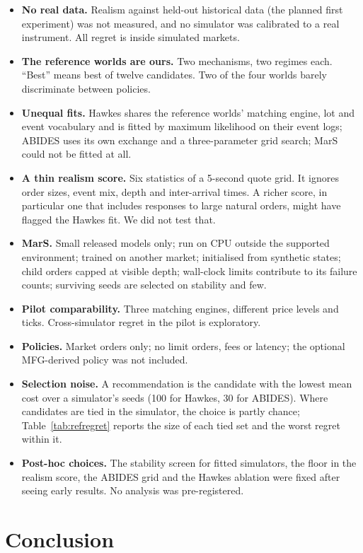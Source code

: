 \begin{itemize}[leftmargin=*,itemsep=2pt]
\item \textbf{No real data.} Realism against held-out historical data (the planned first experiment) was not measured, and no simulator was calibrated to a real instrument. All regret is inside simulated markets.
\item \textbf{The reference worlds are ours.} Two mechanisms, two regimes each. ``Best'' means best of twelve candidates. Two of the four worlds barely discriminate between policies.
\item \textbf{Unequal fits.} Hawkes shares the reference worlds' matching engine, lot and event vocabulary and is fitted by maximum likelihood on their event logs; ABIDES uses its own exchange and a three-parameter grid search; MarS could not be fitted at all.
\item \textbf{A thin realism score.} Six statistics of a 5-second quote grid. It ignores order sizes, event mix, depth and inter-arrival times. A richer score, in particular one that includes responses to large natural orders, might have flagged the Hawkes fit. We did not test that.
\item \textbf{MarS.} Small released models only; run on CPU outside the supported environment; trained on another market; initialised from synthetic states; child orders capped at visible depth; wall-clock limits contribute to its failure counts; surviving seeds are selected on stability and few.
\item \textbf{Pilot comparability.} Three matching engines, different price levels and ticks. Cross-simulator regret in the pilot is exploratory.
\item \textbf{Policies.} Market orders only; no limit orders, fees or latency; the optional MFG-derived policy was not included.
\item \textbf{Selection noise.} A recommendation is the candidate with the lowest mean cost over a simulator's seeds (100 for Hawkes, 30 for ABIDES). Where candidates are tied in the simulator, the choice is partly chance; Table~\ref{tab:refregret} reports the size of each tied set and the worst regret within it.
\item \textbf{Post-hoc choices.} The stability screen for fitted simulators, the floor in the realism score, the ABIDES grid and the Hawkes ablation were fixed after seeing early results. No analysis was pre-registered.
\end{itemize}

\section{Conclusion}

